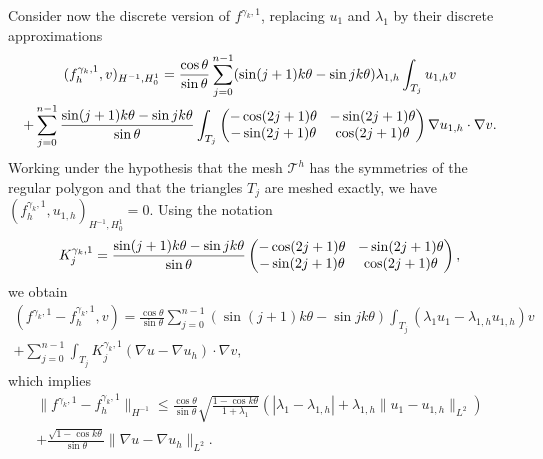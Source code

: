 \documentclass[JEP,XML,SOM,Unicode,ThmDefs,NoFloatCountersInSection,published]{cedram}
\newcommand{\colsep}{\arraycolsep4.5pt}
\theoremstyle{plain}
\theoremstyle{definition}
\begin{document}
Consider now the discrete version of $f^{\gamma_k,1}$, replacing $u_1$ and $\lambda_1$ by their discrete approximations
\vspace*{-5pt}
\begin{multline*}
(f_h^{\gamma_k,1},v)_{H^{-1},H_0^1} = \frac{\cos \theta}{\sin \theta}\sum_{j=0}^{n-1} (\sin(j+1)k\theta-\sin jk\theta) \lambda_{1,h} \int_{T_j} u_{1,h}v\\\colsep
+ \sum_{j=0}^{n-1} \frac{\sin(j+1)k\theta-\sin jk\theta}{\sin \theta} \int_{T_j}\begin{pmatrix}
-\cos (2j+1)\theta & -\sin (2j+1) \theta \\
-\sin (2j+1)\theta & \cos (2j+1)\theta
\end{pmatrix}\nabla u_{1,h} \cdot \nabla v.
\end{multline*}
Working under the hypothesis that the mesh $\mathcal T^h$ has the symmetries of the regular polygon and that the triangles $T_j$ are meshed exactly, we have $(f_h^{\gamma_k,1},u_{1,h})_{H^{-1},H_0^1} = 0$. Using the notation
\[\colsep
K_j^{\gamma_k,1} = \frac{\sin(j+1)k\theta-\sin jk\theta}{\sin \theta} \begin{pmatrix}
-\cos (2j+1)\theta & -\sin (2j+1) \theta \\
-\sin(2j+1)\theta & \cos (2j+1)\theta
\end{pmatrix},
\]
we obtain
\vspace*{-5pt}
\begin{multline*}
(f^{\gamma_k,1}-f^{\gamma_k,1}_h,v) = \frac{\cos \theta}{\sin \theta}\sum_{j=0}^{n-1} (\sin (j+1)k\theta-\sin jk\theta) \int_{T_j}(\lambda_1 u_1-\lambda_{1,h}u_{1,h})v\\
+ \sum_{j=0}^{n-1} \int_{T_j}K_j^{\gamma_k,1}(\nabla u - \nabla u_h)\cdot \nabla v,
\end{multline*}
which implies
\vspace*{-5pt}
\begin{multline*}
\|f^{\gamma_k,1}-f_h^{\gamma_k,1} \|_{H^{-1}} \leq \frac{\cos \theta}{\sin \theta} \sqrt{\frac{1-\cos k\theta}{1+\lambda_1}}(|\lambda_1-\lambda_{1,h}|+\lambda_{1,h}\|u_1-u_{1,h}\|_{L^2}) \\
+ \frac{\sqrt{1-\cos k\theta}}{\sin \theta} \|\nabla u-\nabla u_h\|_{L^2}.
\end{multline*}
\end{document}
